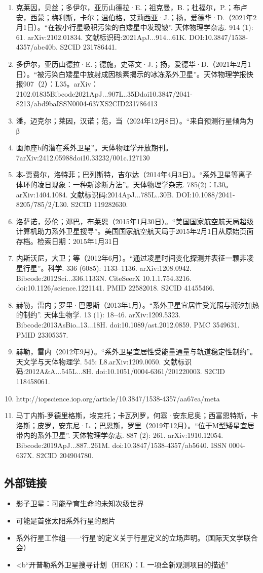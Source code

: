 \begin{enumerate}
\item 克莱因，贝丝；多伊尔，亚历山德拉·E.；祖克曼，B.；杜福尔，P.；布卢安，西蒙；梅利斯，卡尔；温伯格，艾莉西亚·J.；扬，爱德华·D.（2021年2月1日）。“在被小行星吸积污染的白矮星中发现铍”. 天体物理学杂志. 914 (1): 61. arXiv:2102.01834. 文献标识码:2021ApJ...914...61K. DOI:10.3847/1538-4357/abe40b. S2CID 231786441.
\item 多伊尔，亚历山德拉·E.；德施，史蒂文·J.；扬，爱德华·D.（2021年2月1日）。“被污染白矮星中放射成因核素揭示的冰冻系外卫星”。天体物理学报快报907（2）：L35。arXiv：2102.01835Bibcode2021ApJ...907L..35Ddoi10.3847/2041-8213/abd9baISSN0004-637XS2CID231786413
\item 潘，迈克尔；莱因，汉诺；范，当（2024年12月8日）。“来自预测行星倾角为
β
\item 画师座b的潜在系外卫星”。天体物理学开放期刊。7arXiv:2412.05988doi10.33232/001c.127130
\item 本-贾费尔，洛特菲；巴列斯特，吉尔达（2014年4月3日）。“系外卫星等离子体环的凌日现象：一种新诊断方法”。天体物理学杂志. 785(2)：L30。arXiv:1404.1084. 文献标识码:2014ApJ...785L..30B. DOI:10.1088/2041-8205/785/2/L30. S2CID 119282630.
\item 洛萨诺，莎伦；邓巴，布莱恩（2015年1月30日）。“美国国家航空航天局超级计算机助力系外卫星搜寻”。美国国家航空航天局于2015年2月1日从原始页面存档。检索日期：2015年1月31日
\item 内斯沃尼，大卫；等（2012年6月）。“通过凌星时间变化探测并表征一颗非凌星行星”。科学. 336 (6085): 1133–1136. arXiv:1208.0942. Bibcode:2012Sci...336.1133N. CiteSeerX 10.1.1.754.3216. doi:10.1126/science.1221141. PMID 22582018. S2CID 41455466.
\item 赫勒，雷内；罗里·巴恩斯（2013年1月）。“系外卫星宜居性受光照与潮汐加热的制约”. 天体生物学. 13 (1): 18–46. arXiv:1209.5323. Bibcode:2013AsBio..13...18H. doi:10.1089/ast.2012.0859. PMC 3549631. PMID 23305357.
\item 赫勒，雷内（2012年9月）。“系外卫星宜居性受能量通量与轨道稳定性制约”。天文学与天体物理学. 545: L8.arXiv:1209.0050. 文献标识码:2012A&A...545L...8H. doi:10.1051/0004-6361/201220003. S2CID 118458061.
\item http://iopscience.iop.org/article/10.3847/1538-4357/aa67ea/meta
\item 马丁内斯-罗德里格斯，埃克托；卡瓦列罗，何塞·安东尼奥；西富恩特斯，卡洛斯；皮罗，安东尼·L.；巴恩斯，罗里（2019年12月）。“位于M型矮星宜居带内的系外卫星”. 天体物理学杂志. 887 (2): 261. arXiv:1910.12054. Bibcode:2019ApJ...887..261M. doi:10.3847/1538-4357/ab5640. ISSN 0004-637X. S2CID 204904780.
\end{enumerate}
\subsection{外部链接}
\begin{itemize}
\item 影子卫星：可能孕育生命的未知次级世界
\item 可能是首张太阳系外行星的照片
\item 系外行星工作组——‘行星’的定义关于行星定义的立场声明。（国际天文学联合会）
\item <b“开普勒系外卫星搜寻计划（HEK）：I. 一项全新观测项目的描述”
\end{itemize}
